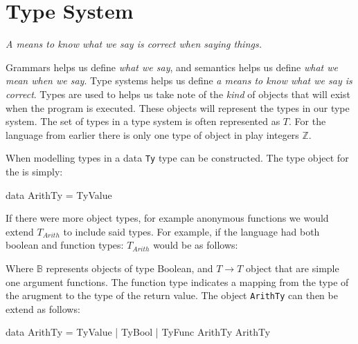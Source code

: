 \section{Type System}
\label{sec:type}

\begin{center}\large\em
A means to know what we say is correct when saying things.
\end{center}

Grammars helps us define \emph{what we say}, and semantics helps us define \emph{what we mean when we say}.
Type systems helps us define \emph{a means to know what we say is correct}.
Types are used to helps us take note of the \emph{kind} of objects that will exist when the program is executed.
These objects will represent the types in our type system.
The set of types in a type system is often represented as $T$.
For the \allang{} language from earlier there is only one type of object in play integers $\mathbb{Z}$.

\begin{bnf}
\end{bnf}

\noindent
When modelling types in \idris{} a data \texttt{Ty} type can be constructed.
The type object for the \allang{} is simply:

\begin{code}
data ArithTy = TyValue
\end{code}

\noindent
If there were more object types, for example anonymous functions we would extend $T_{Arith}$ to include said types.
For example, if the \allang{} language had both boolean and function types: $T_{Arith}$ would be as follows:

\begin{bnf}
\end{bnf}

\noindent
Where $\mathbb{B}$ represents objects of type Boolean, and $T\rightarrow T$ object that are simple one argument functions.
The function type indicates a mapping from the type of the arugment to the type of the return value.
The object \texttt{ArithTy} can then be extend as follows:

\begin{code}
data ArithTy = TyValue
             | TyBool
             | TyFunc ArithTy ArithTy
\end{code}

